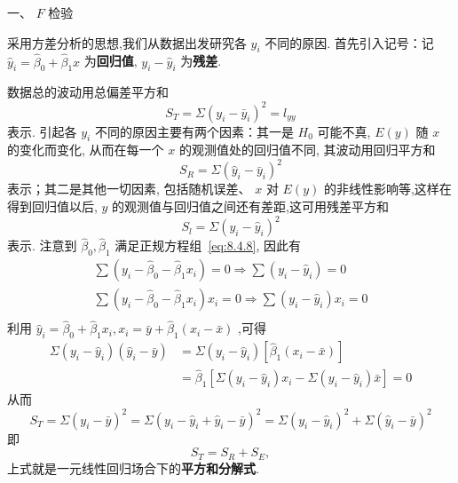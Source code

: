 一、 $F$ 检验

采用方差分析的思想,我们从数据出发研究各 $y_i$ 不同的原因. 首先引入记号：记 $\hat{y}_i = \hat{\beta}_0 + \hat{\beta}_1 x$ 为\textbf{回归值}, $y_i - \hat{y}_i$ 为\textbf{残差}. 

数据总的波动用总偏差平方和
\begin{equation}\label{eq:8.4.10}
S_T=\Sigma ( y_i - \bar{y}_i)^2 = l_{yy} 
\end{equation}
表示. 引起各 $y_i$ 不同的原因主要有两个因素：其一是 $H_0$ 可能不真, $E(y)$ 随 $x$ 的变化而变化, 从而在每一个 $x$ 的观测值处的回归值不同, 其波动用回归平方和
\begin{equation}
S_R=\Sigma{\left( \hat{y}_i-\bar{y}_i \right)}^2 \label{eq:8.4.11}  
\end{equation}
表示；其二是其他一切因素, 包括随机误差、 $x$ 对 $E(y)$ 的非线性影响等,这样在得到回归值以后, $y$ 的观测值与回归值之间还有差距,这可用残差平方和
\begin{equation}
S_l=\Sigma{\left( y_i-\hat{y}_i \right)}^2  
\end{equation}
表示.
注意到 $\hat{\beta}_0, \hat{\beta}_1$ 满足正规方程组~\ref{eq:8.4.8}, 因此有
\begin{equation*}
\begin{array}{c}
\sum{\left( y_i-\widehat{\beta }_0-\widehat{\beta }_1x_i \right) =0\Rightarrow \sum{\left( y_i-\hat{y}_i \right)}}=0\\
\sum{\left( y_i-\widehat{\beta }_0-\widehat{\beta }_1x_i \right) x_i=0\Rightarrow \sum{\left( y_i-\hat{y}_i \right)}}x_i=0\\
\end{array}
\end{equation*}
利用 $\widehat{y}_i=\widehat{\beta }_0+\widehat{\beta }_1x_i,x_i=\bar{y}+\widehat{\beta }_1\left( x_i-\bar{x} \right) $ ,可得 
\begin{equation*}
\begin{aligned} 
\Sigma\left(y_{i}-\hat{y}_{i}\right)\left(\hat{y}_{i}-\bar{y}\right) &=\Sigma\left(y_{i}-\hat{y}_{i}\right)\left[\hat{\beta}_{1}\left(x_{i}-\bar{x}\right)\right] \\ &=\hat{\beta}_{1}\left[\Sigma\left(y_{i}-\hat{y}_{i}\right) x_{i}-\Sigma\left(y_{i}-\hat{y}_{i}\right) \bar{x}\right]=0 
\end{aligned}
\end{equation*}
从而
\begin{equation*}
  S_{T} = \Sigma(y_{i}-\bar{y})^{2} = \Sigma(y_{i} - \hat{y}_{i} + \hat{y}_{i} - \bar{y})^{2} = \Sigma(y_{i} - \hat{y}_{i})^{2} + \Sigma(\hat{y}_{i}-\bar{y})^{2}
\end{equation*}
即
\begin{equation}
S_T = S_R + S_E, \label{eq:8.4.13}
\end{equation}
上式就是一元线性回归场合下的\textbf{平方和分解式}.

